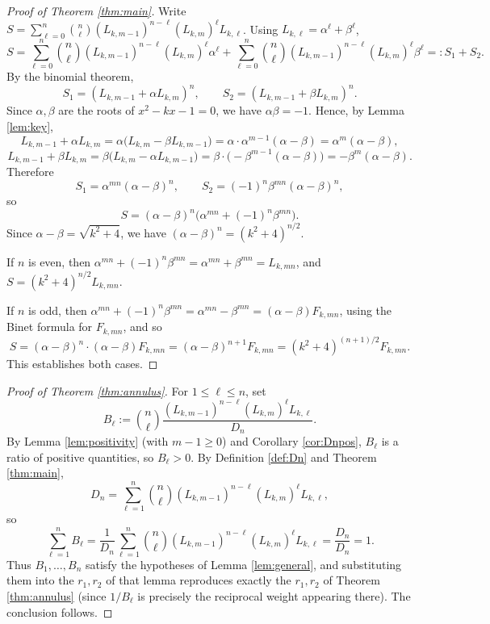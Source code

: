 \documentclass[11pt,a4paper]{article}
\numberwithin{equation}{section}
\numberwithin{table}{section}
\numberwithin{figure}{section}
\begin{document}
	\begin{proof}[Proof of Theorem \ref{thm:main}]
		Write $S=\sum_{\ell=0}^n\binom{n}{\ell}(L_{k,m-1})^{n-\ell}(L_{k,m})^{\ell}L_{k,\ell}$. Using $L_{k,\ell}=\alpha^{\ell}+\beta^{\ell}$,
		\[
		S=\sum_{\ell=0}^n\binom{n}{\ell}(L_{k,m-1})^{n-\ell}(L_{k,m})^{\ell}\alpha^{\ell}
		+\sum_{\ell=0}^n\binom{n}{\ell}(L_{k,m-1})^{n-\ell}(L_{k,m})^{\ell}\beta^{\ell}
		=:S_1+S_2.
		\]
		By the binomial theorem,
		\[
		S_1=(L_{k,m-1}+\alpha L_{k,m})^n,\qquad S_2=(L_{k,m-1}+\beta L_{k,m})^n.
		\]
		Since $\alpha,\beta$ are the roots of $x^2-kx-1=0$, we have $\alpha\beta=-1$. Hence, by Lemma \ref{lem:key},
		\[
		L_{k,m-1}+\alpha L_{k,m}=\alpha\bigl(L_{k,m}-\beta L_{k,m-1}\bigr)=\alpha\cdot\alpha^{m-1}(\alpha-\beta)=\alpha^{m}(\alpha-\beta),
		\]
		\[
		L_{k,m-1}+\beta L_{k,m}=\beta\bigl(L_{k,m}-\alpha L_{k,m-1}\bigr)=\beta\cdot\bigl(-\beta^{m-1}(\alpha-\beta)\bigr)=-\beta^{m}(\alpha-\beta).
		\]
		Therefore
		\[
		S_1=\alpha^{mn}(\alpha-\beta)^n,\qquad S_2=(-1)^n\beta^{mn}(\alpha-\beta)^n,
		\]
		so
		\[
		S=(\alpha-\beta)^n\bigl(\alpha^{mn}+(-1)^n\beta^{mn}\bigr).
		\]
		Since $\alpha-\beta=\sqrt{k^2+4}$, we have $(\alpha-\beta)^n=(k^2+4)^{n/2}$.
		
		If $n$ is even, then $\alpha^{mn}+(-1)^n\beta^{mn}=\alpha^{mn}+\beta^{mn}=L_{k,mn}$, and $S=(k^2+4)^{n/2}L_{k,mn}$.
		
		If $n$ is odd, then $\alpha^{mn}+(-1)^n\beta^{mn}=\alpha^{mn}-\beta^{mn}=(\alpha-\beta)F_{k,mn}$, using the Binet formula for $F_{k,mn}$, and so
		\[
		S=(\alpha-\beta)^n\cdot(\alpha-\beta)F_{k,mn}=(\alpha-\beta)^{n+1}F_{k,mn}=(k^2+4)^{(n+1)/2}F_{k,mn}.
		\]
		This establishes both cases.
	\end{proof}
	
	\begin{proof}[Proof of Theorem \ref{thm:annulus}]
		For $1\le\ell\le n$, set
		\[
		B_\ell:=\binom{n}{\ell}\frac{(L_{k,m-1})^{n-\ell}(L_{k,m})^{\ell}L_{k,\ell}}{D_n}.
		\]
		By Lemma \ref{lem:positivity} (with $m-1\ge0$) and Corollary \ref{cor:Dnpos}, $B_\ell$ is a ratio of positive quantities, so $B_\ell>0$. By Definition \ref{def:Dn} and Theorem \ref{thm:main},
		\[
		D_n=\sum_{\ell=1}^n\binom{n}{\ell}(L_{k,m-1})^{n-\ell}(L_{k,m})^{\ell}L_{k,\ell},
		\]
		so
		\[
		\sum_{\ell=1}^nB_\ell=\frac{1}{D_n}\sum_{\ell=1}^n\binom{n}{\ell}(L_{k,m-1})^{n-\ell}(L_{k,m})^{\ell}L_{k,\ell}=\frac{D_n}{D_n}=1.
		\]
		Thus $B_1,\dots,B_n$ satisfy the hypotheses of Lemma \ref{lem:general}, and substituting them into the $r_1,r_2$ of that lemma reproduces exactly the $r_1,r_2$ of Theorem \ref{thm:annulus} (since $1/B_\ell$ is precisely the reciprocal weight appearing there). The conclusion follows.
	\end{proof}
\end{document}
